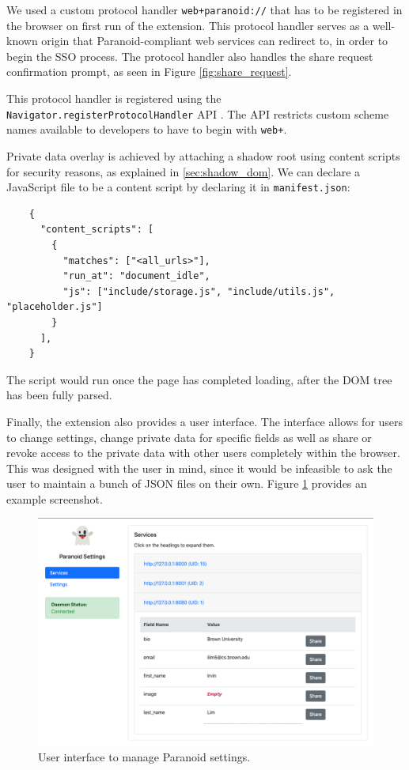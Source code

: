 \documentclass[letterpaper,twocolumn,10pt]{article}
\begin{document}
We used a custom protocol handler \texttt{web+paranoid://} that has to be registered in the browser on first run of the extension. This protocol handler serves as a well-known origin that Paranoid-compliant web services can redirect to, in order to begin the SSO process. The protocol handler also handles the share request confirmation prompt, as seen in Figure \ref{fig:share_request}.

This protocol handler is registered using the \texttt{Navigator.registerProtocolHandler} API \cite{RegisterProtocolHandler}. The API restricts custom scheme names available to developers to have to begin with \texttt{web+}.

Private data overlay is achieved by attaching a shadow root using content scripts for security reasons, as explained in \cref{sec:shadow_dom}. We can declare a JavaScript file to be a content script by declaring it in \texttt{manifest.json}:

\begin{center}
    \begin{lstlisting}
    {
      "content_scripts": [
        {
          "matches": ["<all_urls>"],
          "run_at": "document_idle",
          "js": ["include/storage.js", "include/utils.js", "placeholder.js"]
        }
      ],
    }
    \end{lstlisting}
\end{center}

The script would run once the page has completed loading, after the DOM tree has been fully parsed.

Finally, the extension also provides a user interface. The interface allows for users to change settings, change private data for specific fields as well as share or revoke access to the private data with other users completely within the browser. This was designed with the user in mind, since it would be infeasible to ask the user to maintain a bunch of JSON files on their own. Figure \ref{fig:settings} provides an example screenshot.

\begin{figure}[]
    \centering
    \includegraphics[width=\columnwidth]{png/settings.png}
    \caption{User interface to manage Paranoid settings.}
    \label{fig:settings}
\end{figure}
\end{document}
